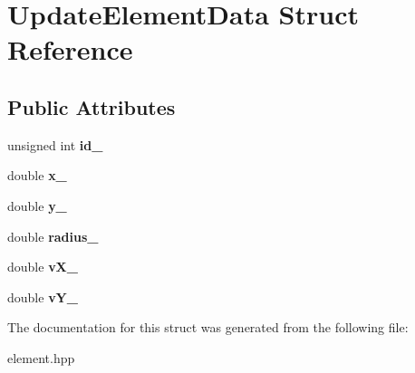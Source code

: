 \hypertarget{structUpdateElementData}{}\section{Update\+Element\+Data Struct Reference}
\label{structUpdateElementData}
\subsection*{Public Attributes}
\begin{DoxyCompactItemize}
\item 
unsigned int {\bfseries id\+\_\+}\hypertarget{structUpdateElementData_a1a3514e0665d80284718b776a32eccbe}{}\label{structUpdateElementData_a1a3514e0665d80284718b776a32eccbe}

\item 
double {\bfseries x\+\_\+}\hypertarget{structUpdateElementData_a1ea1ab4fda073dd2f015b2220f3fc632}{}\label{structUpdateElementData_a1ea1ab4fda073dd2f015b2220f3fc632}

\item 
double {\bfseries y\+\_\+}\hypertarget{structUpdateElementData_ae141528c38fa3379a7ea7ea25c42f873}{}\label{structUpdateElementData_ae141528c38fa3379a7ea7ea25c42f873}

\item 
double {\bfseries radius\+\_\+}\hypertarget{structUpdateElementData_a8e28a1788468cff6778f376b5996d537}{}\label{structUpdateElementData_a8e28a1788468cff6778f376b5996d537}

\item 
double {\bfseries v\+X\+\_\+}\hypertarget{structUpdateElementData_a371672cd72721832a687534d7fcffda8}{}\label{structUpdateElementData_a371672cd72721832a687534d7fcffda8}

\item 
double {\bfseries v\+Y\+\_\+}\hypertarget{structUpdateElementData_a8ef5996e48b498ddeb3decf1a5ccb00b}{}\label{structUpdateElementData_a8ef5996e48b498ddeb3decf1a5ccb00b}

\end{DoxyCompactItemize}


The documentation for this struct was generated from the following file\+:\begin{DoxyCompactItemize}
\item 
element.\+hpp\end{DoxyCompactItemize}
